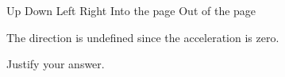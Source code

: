 \documentclass{../../../oss-apphys}
\begin{document}
\begin{enumerate}[leftmargin=15pt]
\begin{enumerate}[leftmargin=15pt]
    \vspace{.1in}
    \underline{\hspace{.3in}} Up\hspace{.3in}
    \underline{\hspace{.3in}} Down\hspace{.3in}
    \underline{\hspace{.3in}} Left\hspace{.3in}
    \underline{\hspace{.3in}} Right\hspace{.3in}
    \underline{\hspace{.3in}} Into the page\hspace{.3in}
    \underline{\hspace{.3in}} Out of the page

    \vspace{.1in}\underline{\hspace{.3in}} The direction is undefined since the
    acceleration is zero.

    \vspace{.1in}Justify your answer.
  \end{enumerate}
  
   

\end{enumerate}
\end{document}

